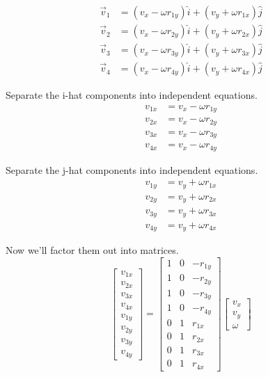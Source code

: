 \begin{align*}
  \vec{v}_1 &= (v_x - \omega r_{1y}) \hat{i} + (v_y + \omega r_{1x}) \hat{j} \\
  \vec{v}_2 &= (v_x - \omega r_{2y}) \hat{i} + (v_y + \omega r_{2x}) \hat{j} \\
  \vec{v}_3 &= (v_x - \omega r_{3y}) \hat{i} + (v_y + \omega r_{3x}) \hat{j} \\
  \vec{v}_4 &= (v_x - \omega r_{4y}) \hat{i} + (v_y + \omega r_{4x}) \hat{j}
\end{align*}

Separate the i-hat components into independent equations.
\begin{align*}
  v_{1x} &= v_x - \omega r_{1y} \\
  v_{2x} &= v_x - \omega r_{2y} \\
  v_{3x} &= v_x - \omega r_{3y} \\
  v_{4x} &= v_x - \omega r_{4y}
\end{align*}

Separate the j-hat components into independent equations.
\begin{align*}
  v_{1y} &= v_y + \omega r_{1x} \\
  v_{2y} &= v_y + \omega r_{2x} \\
  v_{3y} &= v_y + \omega r_{3x} \\
  v_{4y} &= v_y + \omega r_{4x}
\end{align*}

Now we'll factor them out into matrices.
\begin{equation*}
  \begin{bmatrix}
    v_{1x} \\
    v_{2x} \\
    v_{3x} \\
    v_{4x} \\
    v_{1y} \\
    v_{2y} \\
    v_{3y} \\
    v_{4y}
  \end{bmatrix} =
  \begin{bmatrix}
    1 & 0 & -r_{1y} \\
    1 & 0 & -r_{2y} \\
    1 & 0 & -r_{3y} \\
    1 & 0 & -r_{4y} \\
    0 & 1 &  r_{1x} \\
    0 & 1 &  r_{2x} \\
    0 & 1 &  r_{3x} \\
    0 & 1 &  r_{4x}
  \end{bmatrix}
  \begin{bmatrix}
    v_x \\
    v_y \\
    \omega
  \end{bmatrix}
\end{equation*}

